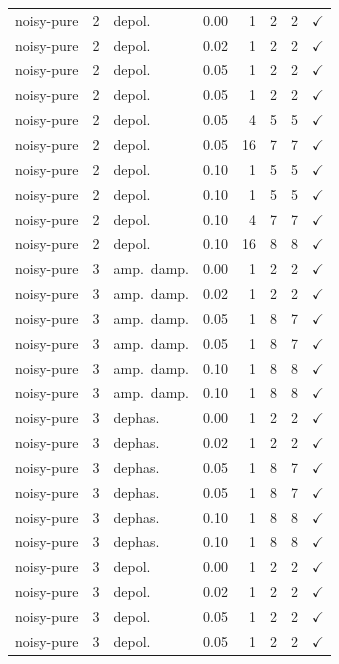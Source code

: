 \documentclass[a4paper,superscriptaddress,nofootinbib,onecolumn,nopdfoutputerror]{quantumarticle}
\begin{document}
\begin{center}
\begin{longtable}{@{}llllrrrc@{}}
noisy-pure & 2 & depol. & 0.00 & 1 & 2 & 2 & $\checkmark$ \\
noisy-pure & 2 & depol. & 0.02 & 1 & 2 & 2 & $\checkmark$ \\
noisy-pure & 2 & depol. & 0.05 & 1 & 2 & 2 & $\checkmark$ \\
noisy-pure & 2 & depol. & 0.05 & 1 & 2 & 2 & $\checkmark$ \\
noisy-pure & 2 & depol. & 0.05 & 4 & 5 & 5 & $\checkmark$ \\
noisy-pure & 2 & depol. & 0.05 & 16 & 7 & 7 & $\checkmark$ \\
noisy-pure & 2 & depol. & 0.10 & 1 & 5 & 5 & $\checkmark$ \\
noisy-pure & 2 & depol. & 0.10 & 1 & 5 & 5 & $\checkmark$ \\
noisy-pure & 2 & depol. & 0.10 & 4 & 7 & 7 & $\checkmark$ \\
noisy-pure & 2 & depol. & 0.10 & 16 & 8 & 8 & $\checkmark$ \\
noisy-pure & 3 & amp.\ damp. & 0.00 & 1 & 2 & 2 & $\checkmark$ \\
noisy-pure & 3 & amp.\ damp. & 0.02 & 1 & 2 & 2 & $\checkmark$ \\
noisy-pure & 3 & amp.\ damp. & 0.05 & 1 & 8 & 7 & $\checkmark$ \\
noisy-pure & 3 & amp.\ damp. & 0.05 & 1 & 8 & 7 & $\checkmark$ \\
noisy-pure & 3 & amp.\ damp. & 0.10 & 1 & 8 & 8 & $\checkmark$ \\
noisy-pure & 3 & amp.\ damp. & 0.10 & 1 & 8 & 8 & $\checkmark$ \\
noisy-pure & 3 & dephas. & 0.00 & 1 & 2 & 2 & $\checkmark$ \\
noisy-pure & 3 & dephas. & 0.02 & 1 & 2 & 2 & $\checkmark$ \\
noisy-pure & 3 & dephas. & 0.05 & 1 & 8 & 7 & $\checkmark$ \\
noisy-pure & 3 & dephas. & 0.05 & 1 & 8 & 7 & $\checkmark$ \\
noisy-pure & 3 & dephas. & 0.10 & 1 & 8 & 8 & $\checkmark$ \\
noisy-pure & 3 & dephas. & 0.10 & 1 & 8 & 8 & $\checkmark$ \\
noisy-pure & 3 & depol. & 0.00 & 1 & 2 & 2 & $\checkmark$ \\
noisy-pure & 3 & depol. & 0.02 & 1 & 2 & 2 & $\checkmark$ \\
noisy-pure & 3 & depol. & 0.05 & 1 & 2 & 2 & $\checkmark$ \\
noisy-pure & 3 & depol. & 0.05 & 1 & 2 & 2 & $\checkmark$ \\

\end{longtable}
\end{center}
\end{document}
